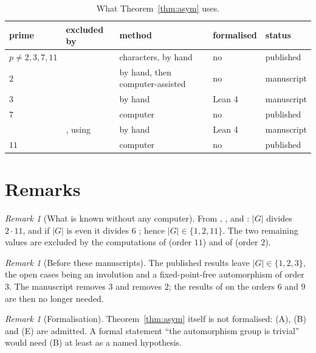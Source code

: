 \documentclass[11pt]{amsart}
\theoremstyle{remark}
\newtheorem{remark}[theorem]{Remark}
\begin{document}
\begin{table}[ht]
\centering\footnotesize
\begin{tabular}{lllll}
\toprule
prime & excluded by & method & formalised & status\\
\midrule
$p\ne2,3,7,11$ & \cite{MM04} & characters, by hand & no & published\\
$2$ & \cite{C2} & by hand, then computer-assisted & no & manuscript\\
$3$ & \cite{D3} & by hand & Lean 4 & manuscript\\
$7$ & \cite{BL11} & computer & no & published\\
    & \cite{D7}, using \cite{CW25} & by hand & Lean 4 & manuscript\\
$11$ & \cite{BL11} & computer & no & published\\
\bottomrule
\end{tabular}
\caption{What Theorem~\ref{thm:asym} uses.}
\end{table}

\section{Remarks}

\begin{remark}[What is known without any computer]
From \cite{MM04}, \cite{CW25}, \cite{D3} and \cite{D7}: $|G|$ divides $2\cdot11$, and if $|G|$ is even it divides $6$
\cite{CW25}; hence $|G|\in\{1,2,11\}$. The two remaining values are excluded by the computations of \cite{BL11} (order $11$)
and of \cite{C2} (order $2$).
\end{remark}

\begin{remark}[Before these manuscripts]
The published results \cite{MM04,Mak10,B09,BL11,CM20,CW25} leave $|G|\in\{1,2,3\}$, the open cases being an involution and a
fixed-point-free automorphism of order $3$. The manuscript \cite{D3} removes $3$ and \cite{C2} removes $2$; the results of
\cite{CM20} on the orders $6$ and $9$ are then no longer needed.
\end{remark}

\begin{remark}[Formalisation]
Theorem~\ref{thm:asym} itself is not formalised: \textup{(A)}, \textup{(B)} and \textup{(E)} are admitted. A formal
statement ``the automorphism group is trivial'' would need \textup{(B)} at least as a named hypothesis.
\end{remark}
\end{document}
